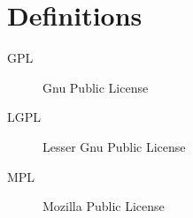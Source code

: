 \documentclass[a4paper,11pt,draft]{article}
\begin{document}





\appendix


\section{Definitions}
\begin{description}
  \item[GPL] Gnu Public License
  \item[LGPL] Lesser Gnu Public License
  \item[MPL] Mozilla Public License
\end{description}
\end{document}
